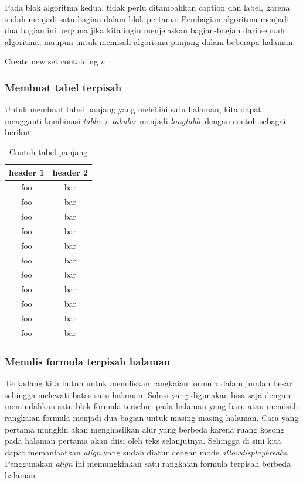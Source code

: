 Pada blok algoritma kedua, tidak perlu ditambahkan caption dan label, karena sudah menjadi satu bagian dalam blok pertama. Pembagian algoritma menjadi dua bagian ini berguna jika kita ingin menjelaskan bagian-bagian dari sebuah algoritma, maupun untuk memisah algoritma panjang dalam beberapa halaman.

\begin{algorithm}                     
	\begin{algorithmic} [1]                   
		\State Create new set containing $v$
		\EndProcedure
	\end{algorithmic}
\end{algorithm}


\subsubsection{Membuat tabel terpisah}

Untuk membuat tabel panjang yang melebihi satu halaman, kita dapat mengganti kombinasi \textit{table + tabular} menjadi \textit{longtable} dengan contoh sebagai berikut.

\begin{table}[h]
	\caption{Contoh tabel panjang}
	\label{tab:myfirstlongtable}
	\centering
	\begin{tabular}{| c | c |}
		\hline
		header 1 & header 2 \\
		\hline \hline
		foo & bar \\ \hline 
		foo & bar \\ \hline
		foo & bar \\ \hline
		foo & bar \\ \hline
		foo & bar \\ \hline
		foo & bar \\ \hline
		foo & bar \\ \hline
		foo & bar \\ \hline
		foo & bar \\ \hline
		foo & bar \\ \hline
		foo & bar \\ \hline
	\end{tabular}
\end{table}


\subsubsection{Menulis formula terpisah halaman}

Terkadang kita butuh untuk menuliskan rangkaian formula dalam jumlah besar sehingga melewati batas satu halaman. Solusi yang digunakan bisa saja dengan memindahkan satu blok formula tersebut pada halaman yang baru atau memisah rangkaian formula menjadi dua bagian untuk masing-masing halaman. Cara yang pertama mungkin akan menghasilkan alur yang berbeda karena ruang kosong pada halaman pertama akan diisi oleh teks selanjutnya. Sehingga di sini kita dapat memanfaatkan \textit{align} yang sudah diatur dengan mode \textit{allowdisplaybreaks}. Penggunakan \textit{align} ini memungkinkan satu rangkaian formula terpisah berbeda halaman. 

